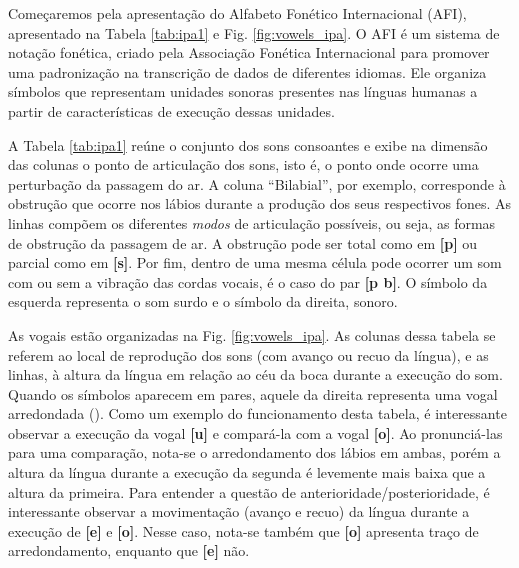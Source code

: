 Começaremos pela apresentação do Alfabeto Fonético Internacional (AFI), apresentado na Tabela \ref{tab:ipa1} e Fig. \ref{fig:vowels_ipa}. O AFI é um sistema de notação fonética, criado pela Associação Fonética Internacional para promover uma padronização na transcrição de dados de diferentes idiomas. Ele organiza símbolos que representam unidades sonoras presentes nas línguas humanas a partir de características de execução dessas unidades. 

A Tabela \ref{tab:ipa1} reúne o conjunto dos sons consoantes e exibe na dimensão das colunas o ponto de articulação dos sons, isto é, o ponto onde ocorre uma perturbação da passagem do ar. A coluna “Bilabial”, por exemplo, corresponde à obstrução que ocorre nos lábios durante a produção dos seus respectivos fones. As linhas compõem os diferentes \textit{modos} de articulação possíveis, ou seja, as formas de obstrução da passagem de ar. A obstrução pode ser total como em \textbf{[p]} ou parcial como em \textbf{[s]}. Por fim, dentro de uma mesma célula pode ocorrer um som com ou sem a vibração das cordas vocais, é o caso do par \textbf{[p b]}. O símbolo da esquerda representa o som surdo e o símbolo da direita, sonoro. 

As vogais estão organizadas na Fig. \ref{fig:vowels_ipa}. As colunas dessa tabela se referem ao local de reprodução dos sons (com avanço ou recuo da língua), e as linhas, à altura da língua em relação ao céu da boca durante a execução do som. Quando os símbolos aparecem em pares, aquele da direita representa uma vogal arredondada (\cite{paraconhecer:2015}). Como um exemplo do funcionamento desta tabela, é interessante observar a execução da vogal \textbf{[u]} e compará-la com a vogal \textbf{[o]}. Ao pronunciá-las para uma comparação, nota-se o arredondamento dos lábios em ambas, porém a altura da língua durante a execução da segunda é levemente mais baixa que a altura da primeira. Para entender a questão de anterioridade/posterioridade, é interessante observar a movimentação (avanço e recuo) da língua durante a execução de \textbf{[e]} e \textbf{[o]}. Nesse caso, nota-se também que \textbf{[o]} apresenta traço de arredondamento, enquanto que \textbf{[e]} não.

